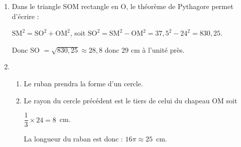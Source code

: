 
\medskip  

%
%
%
%
%
%
 
\begin{enumerate}
\item %
Dans le triangle SOM rectangle en O, le théorème de Pythagore permet d'écrire :

$\text{SM}^2 = \text{SO}^2 + \text{OM}^2$, soit $\text{SO}^2 = \text{SM}^2 - \text{OM}^2 = 37,5^2 - 24^2 = 830,25$.

Donc SO $ = \sqrt{830,25} \approx 28,8$ donc 29 cm à l'unité près.
\item %

	\begin{enumerate}
		\item %
Le ruban prendra la forme d'un cercle. 
		\item %
Le rayon du cercle précédent est le tiers de celui du chapeau OM soit 

$\dfrac{1}{3} \times 24 = 8$~cm.
		
La longueur du raban est donc : $16\pi \approx 25$~cm. 
	\end{enumerate}
\end{enumerate}

\vspace{0,5cm}

